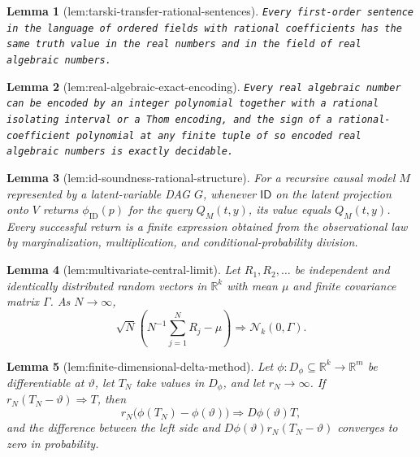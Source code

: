 \documentclass{article}
\newtheorem{lemma}{Lemma}
\begin{document}
\begin{lemma}[lem:tarski-transfer-rational-sentences]\label{lem:tarski-transfer-rational-sentences}
\texttt{Every first-\allowbreak{}order sentence in the language of ordered fields with rational coefficients has the same truth value in the real numbers and in the field of real algebraic numbers.}
\end{lemma}

\begin{lemma}[lem:real-algebraic-exact-encoding]\label{lem:real-algebraic-exact-encoding}
\texttt{Every real algebraic number can be encoded by an integer polynomial together with a rational isolating interval or a Thom encoding,\allowbreak{} and the sign of a rational-\allowbreak{}coefficient polynomial at any finite tuple of so encoded real algebraic numbers is exactly decidable.}
\end{lemma}

\begin{lemma}[lem:id-soundness-rational-structure]\label{lem:id-soundness-rational-structure}
For a recursive causal model \(M\) represented by a latent-variable DAG \(G\), whenever \(\mathsf{ID}\) on the latent projection onto \(V\) returns \(\phi_{\mathrm{ID}}(p)\) for the query \(Q_M(t,y)\), its value equals \(Q_M(t,y)\).  Every successful return is a finite expression obtained from the observational law by marginalization, multiplication, and conditional-probability division.
\end{lemma}

\begin{lemma}[lem:multivariate-central-limit]\label{lem:multivariate-central-limit}
Let \(R_1,R_2,\ldots\) be independent and identically distributed random
vectors in \(\mathbb R^k\) with mean \(\mu\) and finite covariance matrix
\(\Gamma\).  As \(N\to\infty\),
\[
\sqrt N\left(N^{-1}\sum_{j=1}^N R_j-\mu\right)
\Rightarrow\mathcal N_k(0,\Gamma).
\]
\end{lemma}

\begin{lemma}[lem:finite-dimensional-delta-method]\label{lem:finite-dimensional-delta-method}
Let \(\phi:D_\phi\subseteq\mathbb R^k\to\mathbb R^m\) be differentiable at
\(\vartheta\), let \(T_N\) take values in \(D_\phi\), and let
\(r_N\to\infty\).  If \(r_N(T_N-\vartheta)\Rightarrow T\), then
\[
r_N\bigl(\phi(T_N)-\phi(\vartheta)\bigr)
\Rightarrow D\phi(\vartheta)T,
\]
and the difference between the left side and
\(D\phi(\vartheta)r_N(T_N-\vartheta)\) converges to zero in probability.
\end{lemma}
\end{document}
